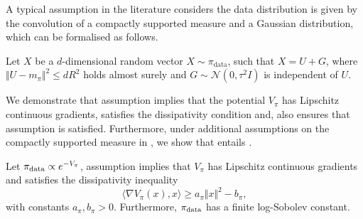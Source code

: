 A typical assumption in the literature \citep{saremi2024chain, grenioux2024stochastic} considers the data distribution is given by the convolution of a compactly supported measure and a Gaussian distribution, which can be formalised as follows.
\begin{assumption}\label{assumption:compact_plus_gaussian_target_1}
     Let $ X$ be a $d$-dimensional random vector $X \sim\pi_{\text{data}}$, such that $X = U + G$, where $\Vert U - m_{\pi}\Vert^2 \leq  d R^2$ holds almost surely and $G \sim \mathcal{N}(0, \tau^2 I)$ is independent of $U$. 
\end{assumption}
We demonstrate that assumption  implies that the potential $V_\pi$ has Lipschitz continuous gradients, satisfies the dissipativity condition and, also ensures that assumption  is satisfied. Furthermore, under additional assumptions on the compactly supported measure in , we show that  entails .
\begin{lemma}\label{lemma:implications_between_assumptions}
Let $\operatorname*{\pi_{\text{data}}}\propto e^{-V_\pi}$,    assumption  implies that $V_\pi$ has Lipschitz continuous gradients and satisfies the dissipativity inequality
\begin{equation*}
    \langle\nabla V_\pi(x), x\rangle\geq a_\pi \Vert x\Vert^2 - b_\pi,
\end{equation*}
with constants $a_\pi, b_\pi>0$. Furthermore, $\operatorname*{\pi_{\text{data}}}$ has a finite log-Sobolev constant.
\end{lemma}
